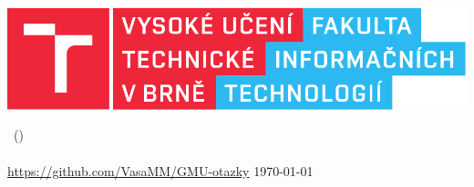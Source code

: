 \includegraphics{FIT.pdf}

\begin{center}
	\LARGE
	\courseName\ (\courseShortcut)\\
	\Huge
		\projectName\\
	\normalsize
	\url{https://github.com/VasaMM/GMU-otazky}
	\hfill
	\today
\end{center}




\newpage
{}
\tableofcontents
\newpage

